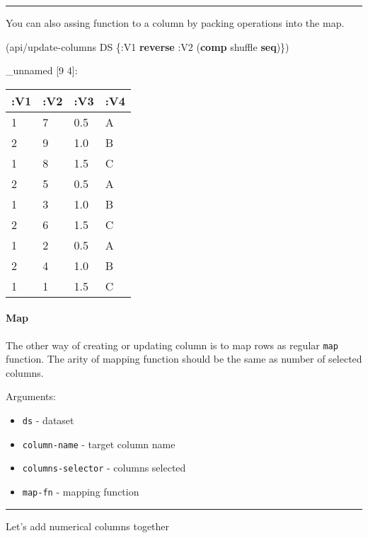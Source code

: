 \documentclass[]{article}
\newenvironment{Shaded}{\begin{snugshade}}{\end{snugshade}}
\newcommand{\AttributeTok}[1]{\textcolor[rgb]{0.77,0.63,0.00}{#1}}
\newcommand{\KeywordTok}[1]{\textcolor[rgb]{0.13,0.29,0.53}{\textbf{#1}}}
\newcommand{\NormalTok}[1]{#1}
\providecommand{\tightlist}{%
  \setlength{\itemsep}{0pt}\setlength{\parskip}{0pt}}
\let\oldparagraph\paragraph
\renewcommand{\paragraph}[1]{\oldparagraph{#1}\mbox{}}
\begin{document}
\begin{center}\rule{0.5\linewidth}{0.5pt}\end{center}

You can also assing function to a column by packing operations into the
map.

\begin{Shaded}
\begin{Highlighting}[]
\NormalTok{(api/update-columns DS \{}\AttributeTok{:V1} \KeywordTok{reverse}
                        \AttributeTok{:V2}\NormalTok{ (}\KeywordTok{comp}\NormalTok{ shuffle }\KeywordTok{seq}\NormalTok{)\})}
\end{Highlighting}
\end{Shaded}

\_unnamed {[}9 4{]}:

\begin{longtable}[]{@{}llll@{}}
\toprule
:V1 & :V2 & :V3 & :V4\tabularnewline
\midrule
\endhead
1 & 7 & 0.5 & A\tabularnewline
2 & 9 & 1.0 & B\tabularnewline
1 & 8 & 1.5 & C\tabularnewline
2 & 5 & 0.5 & A\tabularnewline
1 & 3 & 1.0 & B\tabularnewline
2 & 6 & 1.5 & C\tabularnewline
1 & 2 & 0.5 & A\tabularnewline
2 & 4 & 1.0 & B\tabularnewline
1 & 1 & 1.5 & C\tabularnewline
\bottomrule
\end{longtable}

\hypertarget{map}{%
\paragraph{Map}\label{map}}

The other way of creating or updating column is to map rows as regular
\texttt{map} function. The arity of mapping function should be the same
as number of selected columns.

Arguments:

\begin{itemize}
\tightlist
\item
  \texttt{ds} - dataset
\item
  \texttt{column-name} - target column name
\item
  \texttt{columns-selector} - columns selected
\item
  \texttt{map-fn} - mapping function
\end{itemize}

\begin{center}\rule{0.5\linewidth}{0.5pt}\end{center}

Let's add numerical columns together
\end{document}
